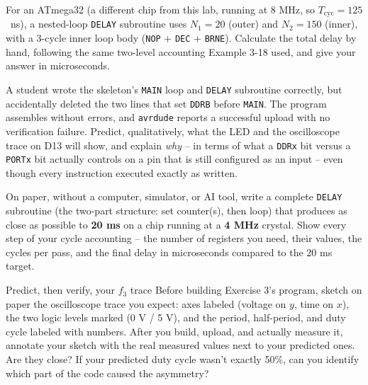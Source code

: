 \documentclass[11pt]{article}
\begin{document}
\takehomebanner

\begin{trace}
For an ATmega32 (a different chip from this lab, running at 8 MHz, so
$T_{\text{cyc}} = 125$~ns), a nested-loop \texttt{DELAY} subroutine uses
$N_1 = 20$ (outer) and $N_2 = 150$ (inner), with a 3-cycle inner loop body
(\texttt{NOP} + \texttt{DEC} + \texttt{BRNE}). Calculate the total delay by hand,
following the same two-level accounting Example 3-18 used, and give your answer in
microseconds.
\end{trace}

\begin{bug}
A student wrote the skeleton's \texttt{MAIN} loop and \texttt{DELAY} subroutine
correctly, but accidentally deleted the two lines that set \texttt{DDRB} before
\texttt{MAIN}. The program assembles without errors, and \texttt{avrdude} reports a
successful upload with no verification failure. Predict, qualitatively, what the LED
and the oscilloscope trace on D13 will show, and explain \emph{why} -- in terms of
what a \texttt{DDRx} bit versus a \texttt{PORTx} bit actually controls on a pin that
is still configured as an input -- even though every instruction executed exactly as
written.
\end{bug}

\begin{writecode}
On paper, without a computer, simulator, or AI tool, write a complete
\texttt{DELAY} subroutine (the two-part structure: set counter(s), then loop) that
produces as close as possible to \textbf{20 ms} on a chip running at a
\textbf{4 MHz} crystal. Show every step of your cycle accounting -- the number of
registers you need, their values, the cycles per pass, and the final delay in
microseconds compared to the 20 ms target.
\end{writecode}

\begin{drawex}{Predict, then verify, your $f_3$ trace}
Before building Exercise 3's program, sketch on paper the oscilloscope trace you
expect: axes labeled (voltage on $y$, time on $x$), the two logic levels marked
(0 V / 5 V), and the period, half-period, and duty cycle labeled with numbers.
After you build, upload, and actually measure it, annotate your sketch with the real
measured values next to your predicted ones. Are they close? If your predicted duty
cycle wasn't exactly 50\%, can you identify which part of the code caused the
asymmetry?
\end{drawex}
\end{document}
